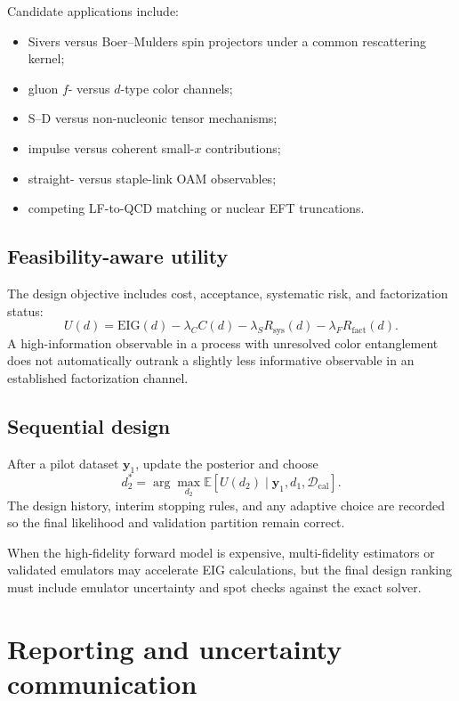 \documentclass[11pt]{article}
\newcommand{\E}{\mathbb E}
\newcommand{\caldata}{\mathcal D_{\mathrm{cal}}}
\newcommand{\sys}{\mathrm{sys}}
\begin{document}
Candidate applications include:
\begin{itemize}
\item Sivers versus Boer--Mulders spin projectors under a common rescattering
kernel;
\item gluon \(f\)- versus \(d\)-type color channels;
\item S--D versus non-nucleonic tensor mechanisms;
\item impulse versus coherent small-\(x\) contributions;
\item straight- versus staple-link OAM observables;
\item competing LF-to-QCD matching or nuclear EFT truncations.
\end{itemize}

\subsection{Feasibility-aware utility}

The design objective includes cost, acceptance, systematic risk, and
factorization status:
\begin{equation}
 U(d)
 =
 \mathrm{EIG}(d)
 -
 \lambda_C C(d)
 -
 \lambda_S R_{\sys}(d)
 -
 \lambda_F R_{\mathrm{fact}}(d).
 \label{eq:design-utility}
\end{equation}
A high-information observable in a process with unresolved color entanglement
does not automatically outrank a slightly less informative observable in an
established factorization channel.

\subsection{Sequential design}

After a pilot dataset \(\bm y_1\), update the posterior and choose
\begin{equation}
 d_2^*
 =
 \arg\max_{d_2}
 \E[
 U(d_2)
 \mid
 \bm y_1,d_1,\caldata
 ].
 \label{eq:sequential-design}
\end{equation}
The design history, interim stopping rules, and any adaptive choice are
recorded so the final likelihood and validation partition remain correct.

When the high-fidelity forward model is expensive, multi-fidelity estimators
or validated emulators may accelerate EIG calculations, but the final design
ranking must include emulator uncertainty and spot checks against the exact
solver.

\section{Reporting and uncertainty communication}
\label{sec:reporting}
\end{document}
